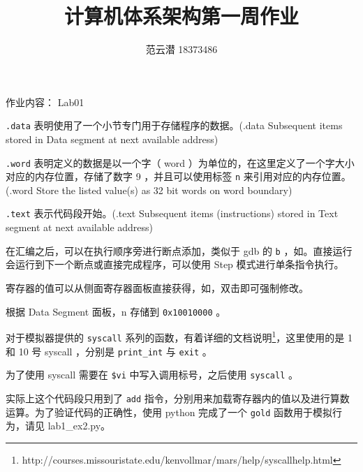 \documentclass[lang=cn,11pt,a4paper,cite=authoryear]{elegantpaper}
\title{计算机体系架构\quad 第一周作业}
\author{范云潜 18373486}
\institute{微电子学院 184111 班}
\date{\zhtoday}
\begin{document}
\maketitle

作业内容： Lab01

\tableofcontents






\lstinline{.data} 表明使用了一个小节专门用于存储程序的数据。(.data       Subsequent items stored in Data segment at next available address)

\lstinline{.word} 表明定义的数据是以一个字（ word ）为单位的，在这里定义了一个字大小对应的内存位置，存储了数字 9 ，并且可以使用标签 \lstinline{n} 来引用对应的内存位置。(.word       Store the listed value(s) as 32 bit words on word boundary)

\lstinline{.text} 表示代码段开始。(.text       Subsequent items (instructions) stored in Text segment at next available address)


在汇编之后，可以在执行顺序旁进行断点添加，类似于 gdb 的 \lstinline{b} ，如。直接运行会运行到下一个断点或直接完成程序，可以使用 Step 模式进行单条指令执行。



寄存器的值可以从侧面寄存器面板直接获得，如，双击即可强制修改。




根据 Data Segment 面板，n 存储到 \lstinline{0x10010000} 。


对于模拟器提供的 \lstinline{syscall} 系列的函数，有着详细的文档说明\footnote{http://courses.missouristate.edu/kenvollmar/mars/help/syscallhelp.html}，这里使用的是 1 和 10 号 syscall ，分别是 \lstinline{print_int} 与 \lstinline{exit} 。

为了使用 syscall 需要在 \lstinline{$vi} 中写入调用标号，之后使用 \lstinline{syscall} 。


实际上这个代码段只用到了 \lstinline{add} 指令，分别用来加载寄存器内的值以及进行算数运算。为了验证代码的正确性，使用 python 完成了一个 \lstinline{gold} 函数用于模拟行为，请见 lab1\_ex2.py。
\end{document}
